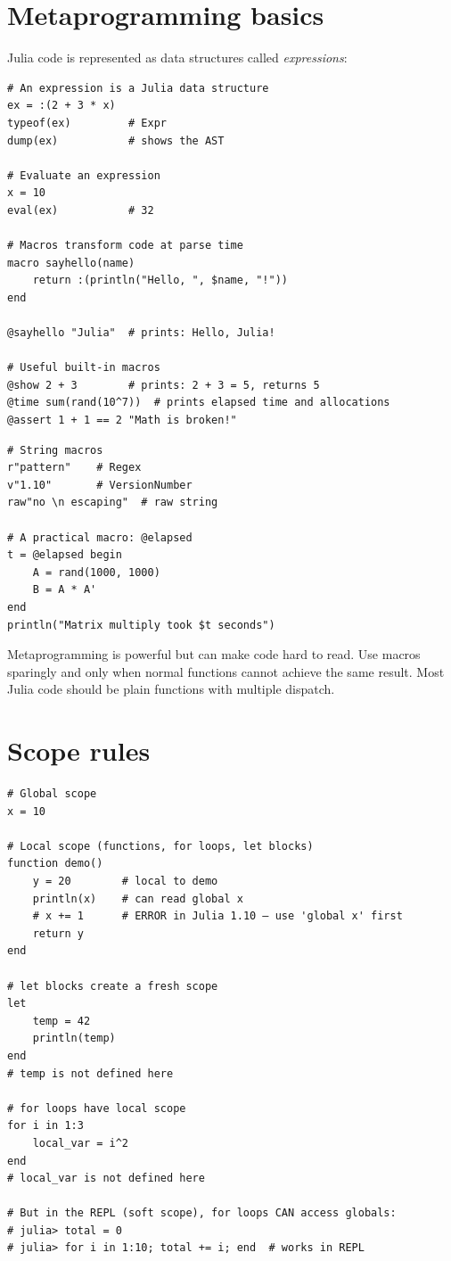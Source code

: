 \section{Metaprogramming basics}

Julia code is represented as data structures called \emph{expressions}:

\begin{verbatim}
# An expression is a Julia data structure
ex = :(2 + 3 * x)
typeof(ex)         # Expr
dump(ex)           # shows the AST

# Evaluate an expression
x = 10
eval(ex)           # 32

# Macros transform code at parse time
macro sayhello(name)
    return :(println("Hello, ", $name, "!"))
end

@sayhello "Julia"  # prints: Hello, Julia!

# Useful built-in macros
@show 2 + 3        # prints: 2 + 3 = 5, returns 5
@time sum(rand(10^7))  # prints elapsed time and allocations
@assert 1 + 1 == 2 "Math is broken!"
\end{verbatim}

\begin{verbatim}
# String macros
r"pattern"    # Regex
v"1.10"       # VersionNumber
raw"no \n escaping"  # raw string

# A practical macro: @elapsed
t = @elapsed begin
    A = rand(1000, 1000)
    B = A * A'
end
println("Matrix multiply took $t seconds")
\end{verbatim}

\begin{warningbox}
Metaprogramming is powerful but can make code hard to read. Use macros sparingly and only when normal functions cannot achieve the same result. Most Julia code should be plain functions with multiple dispatch.
\end{warningbox}

\section{Scope rules}

\begin{verbatim}
# Global scope
x = 10

# Local scope (functions, for loops, let blocks)
function demo()
    y = 20        # local to demo
    println(x)    # can read global x
    # x += 1      # ERROR in Julia 1.10 — use 'global x' first
    return y
end

# let blocks create a fresh scope
let
    temp = 42
    println(temp)
end
# temp is not defined here

# for loops have local scope
for i in 1:3
    local_var = i^2
end
# local_var is not defined here

# But in the REPL (soft scope), for loops CAN access globals:
# julia> total = 0
# julia> for i in 1:10; total += i; end  # works in REPL
\end{verbatim}

